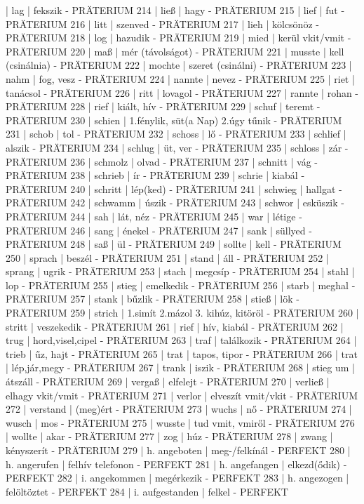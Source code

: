 \documentclass{article}
\newenvironment{exmp}{\verbatim}{\endverbatim}
\begin{document}
\begin{exmp}
213 | lag | fekszik - PRÄTERIUM
214 | ließ | hagy - PRÄTERIUM
215 | lief | fut - PRÄTERIUM
216 | litt | szenved - PRÄTERIUM
217 | lieh | kölcsönöz - PRÄTERIUM
218 | log | hazudik - PRÄTERIUM
219 | mied | kerül vkit/vmit - PRÄTERIUM
220 | maß | mér (távolságot) - PRÄTERIUM
221 | musste | kell (csinálnia) - PRÄTERIUM
222 | mochte | szeret (csinálni) - PRÄTERIUM
223 | nahm | fog, vesz - PRÄTERIUM
224 | nannte | nevez - PRÄTERIUM
225 | riet | tanácsol - PRÄTERIUM
226 | ritt | lovagol - PRÄTERIUM
227 | rannte  | rohan - PRÄTERIUM
228 | rief | kiált, hív - PRÄTERIUM
229 | schuf | teremt - PRÄTERIUM
230 | schien | 1.fénylik, süt(a Nap) 2.úgy tűnik - PRÄTERIUM
231 | schob | tol - PRÄTERIUM
232 | schoss | lő - PRÄTERIUM
233 | schlief | alszik - PRÄTERIUM
234 | schlug | üt, ver - PRÄTERIUM
235 | schloss | zár - PRÄTERIUM
236 | schmolz | olvad - PRÄTERIUM
237 | schnitt | vág - PRÄTERIUM
238 | schrieb | ír - PRÄTERIUM
239 | schrie | kiabál - PRÄTERIUM
240 | schritt | lép(ked) - PRÄTERIUM
241 | schwieg | hallgat - PRÄTERIUM
242 | schwamm | úszik - PRÄTERIUM
243 | schwor | esküszik - PRÄTERIUM
244 | sah | lát, néz - PRÄTERIUM
245 | war | létige - PRÄTERIUM
246 | sang | énekel - PRÄTERIUM
247 | sank | süllyed - PRÄTERIUM
248 | saß | ül - PRÄTERIUM
249 | sollte | kell - PRÄTERIUM
250 | sprach | beszél - PRÄTERIUM
251 | stand | áll - PRÄTERIUM
252 | sprang | ugrik - PRÄTERIUM
253 | stach | megcsíp - PRÄTERIUM
254 | stahl | lop - PRÄTERIUM
255 | stieg | emelkedik - PRÄTERIUM
256 | starb | meghal - PRÄTERIUM
257 | stank | bűzlik - PRÄTERIUM
258 | stieß | lök - PRÄTERIUM
259 | strich | 1.simít 2.mázol 3. kihúz, kitöröl - PRÄTERIUM
260 | stritt | veszekedik - PRÄTERIUM
261 | rief | hív, kiabál - PRÄTERIUM
262 | trug | hord,visel,cipel - PRÄTERIUM
263 | traf | találkozik - PRÄTERIUM
264 | trieb | űz, hajt - PRÄTERIUM
265 | trat | tapos, tipor - PRÄTERIUM
266 | trat | lép,jár,megy - PRÄTERIUM
267 | trank | iszik - PRÄTERIUM
268 | stieg um | átszáll - PRÄTERIUM
269 | vergaß | elfelejt - PRÄTERIUM
270 | verließ | elhagy vkit/vmit - PRÄTERIUM
271 | verlor | elveszít vmit/vkit - PRÄTERIUM
272 | verstand | (meg)ért - PRÄTERIUM
273 | wuchs | nő - PRÄTERIUM
274 | wusch | mos - PRÄTERIUM
275 | wusste | tud vmit, vmiről - PRÄTERIUM
276 | wollte | akar - PRÄTERIUM
277 | zog | húz - PRÄTERIUM
278 | zwang | kényszerít - PRÄTERIUM
279 | h. angeboten | meg-/felkínál - PERFEKT
280 | h. angerufen | felhív telefonon - PERFEKT
281 | h. angefangen | elkezd(ődik) - PERFEKT
282 | i. angekommen | megérkezik - PERFEKT
283 | h. angezogen | felöltöztet - PERFEKT
284 | i. aufgestanden | felkel - PERFEKT

\end{exmp}
\end{document}
